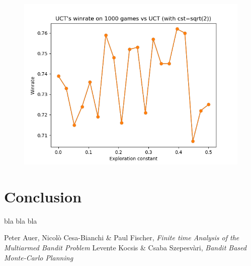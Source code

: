 \documentclass[a4paper]{article}
\theoremstyle{definition}
\begin{document}
\begin{figure}[h]
\centering
\includegraphics[scale=0.7]{test4.png}
\caption{}
\end{figure}

\newpage

\section{Conclusion}

bla bla bla

\newpage
%
\begin{thebibliography}{9}

Peter Auer, Nicol\`o Cesa-Bianchi \& Paul Fischer, {\em Finite time Analysis of the Multiarmed Bandit Problem}
Levente Kocsis \& Csaba Szepesv\`ari, {\em Bandit Based Monte-Carlo Planning}

\end{thebibliography}
\end{document}
